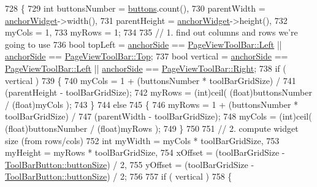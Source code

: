 \begin{DoxyCode}
728 \{
729     \textcolor{keywordtype}{int} buttonsNumber = \hyperlink{classToolBarPrivate_a3808da7a9dd822effa1fd0961dc84c0e}{buttons}.count(),
730         parentWidth = \hyperlink{classToolBarPrivate_afaae01eea9e15a9a88c02cc1a6636528}{anchorWidget}->width(),
731         parentHeight = \hyperlink{classToolBarPrivate_afaae01eea9e15a9a88c02cc1a6636528}{anchorWidget}->height(),
732         myCols = 1,
733         myRows = 1;
734 
735     \textcolor{comment}{// 1. find out columns and rows we're going to use}
736     \textcolor{keywordtype}{bool} topLeft = \hyperlink{classToolBarPrivate_ab776848ec81463b3008086418bc55161}{anchorSide} == \hyperlink{classPageViewToolBar_a6410ac0bc9e35fba1314cfd6d7049385ae2896772e25f563086c120f64857fa6c}{PageViewToolBar::Left} || 
      \hyperlink{classToolBarPrivate_ab776848ec81463b3008086418bc55161}{anchorSide} == \hyperlink{classPageViewToolBar_a6410ac0bc9e35fba1314cfd6d7049385aa0a8431d0106205e2fd3d2122ec3a2e3}{PageViewToolBar::Top};
737     \textcolor{keywordtype}{bool} vertical = \hyperlink{classToolBarPrivate_ab776848ec81463b3008086418bc55161}{anchorSide} == \hyperlink{classPageViewToolBar_a6410ac0bc9e35fba1314cfd6d7049385ae2896772e25f563086c120f64857fa6c}{PageViewToolBar::Left} || 
      \hyperlink{classToolBarPrivate_ab776848ec81463b3008086418bc55161}{anchorSide} == \hyperlink{classPageViewToolBar_a6410ac0bc9e35fba1314cfd6d7049385a67d6065aeb6f242a23f9b9ae2426b136}{PageViewToolBar::Right};
738     \textcolor{keywordflow}{if} ( vertical )
739     \{
740         myCols = 1 + (buttonsNumber * toolBarGridSize) /
741                  (parentHeight - toolBarGridSize);
742         myRows = (int)ceil( (\textcolor{keywordtype}{float})buttonsNumber / (float)myCols );
743     \}
744     \textcolor{keywordflow}{else}
745     \{
746         myRows = 1 + (buttonsNumber * toolBarGridSize) /
747                  (parentWidth - toolBarGridSize);
748         myCols = (int)ceil( (\textcolor{keywordtype}{float})buttonsNumber / (float)myRows );
749     \}
750 
751     \textcolor{comment}{// 2. compute widget size (from rows/cols)}
752     \textcolor{keywordtype}{int} myWidth = myCols * toolBarGridSize,
753         myHeight = myRows * toolBarGridSize,
754         xOffset = (toolBarGridSize - \hyperlink{classToolBarButton_a124410faa69251b2a84d7ab039d6670d}{ToolBarButton::buttonSize}) / 2,
755         yOffset = (toolBarGridSize - \hyperlink{classToolBarButton_a124410faa69251b2a84d7ab039d6670d}{ToolBarButton::buttonSize}) / 2;
756 
757     \textcolor{keywordflow}{if} ( vertical )
758     \{

\end{DoxyCode}
